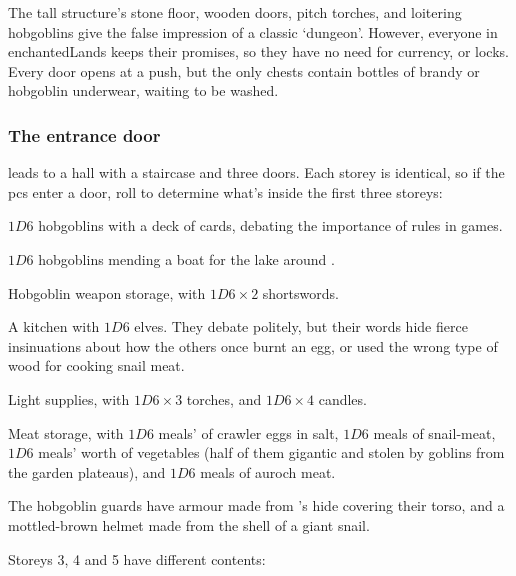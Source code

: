\begin{multicols}{2}
The tall structure's stone floor, wooden doors, pitch torches, and loitering hobgoblins give the false impression of a classic `dungeon'.
However, everyone in \gls{enchantedLands} keeps their promises, so they have no need for currency, or locks.
Every door opens at a push, but the only chests contain bottles of brandy or hobgoblin underwear, waiting to be washed.

\subsubsection{The entrance door}
leads to a hall with a staircase and three doors.
Each storey is identical, so if the \glspl{pc} enter a door, roll to determine what's inside the first three storeys:

\begin{dlist}
  \item
  $1D6$ hobgoblins with a deck of cards, debating the importance of rules in games.
  \item
  $1D6$ hobgoblins mending a boat for the lake around .
  \item
  Hobgoblin weapon storage, with $1D6 \times 2$ shortswords.
  \item
  A kitchen with $1D6$ elves.
  They debate politely, but their words hide fierce insinuations about how the others once burnt an egg, or used the wrong type of wood for cooking snail meat.
  \item
  Light supplies, with $1D6 \times 3$ torches, and $1D6 \times 4$ candles.
  \item
  Meat storage, with $1D6$ meals' of \gls{crawler} eggs in salt, $1D6$ meals of snail-meat, $1D6$ meals' worth of vegetables (half of them gigantic and stolen by goblins from the garden plateaus), and $1D6$ meals of auroch meat.
\end{dlist}

\enchantedHobgoblin

The hobgoblin guards have \gls{armour} made from 's hide \gls{covering} their torso, and a mottled-brown helmet made from the shell of a giant snail.

Storeys 3, 4 and 5 have different contents:


\end{multicols}
